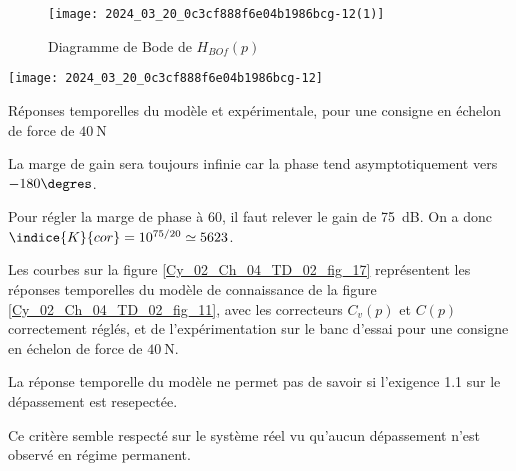 \begin{figure}[!h]
\texttt{[image: 2024\_03\_20\_0c3cf888f6e04b1986bcg-12(1)]}
\caption{Diagramme de Bode de $H_{B O f}(p)$  \label{Cy_02_Ch_04_TD_02_fig_16}}
\end{figure}

\begin{marginfigure}%
\texttt{[image: 2024\_03\_20\_0c3cf888f6e04b1986bcg-12]}
\caption{Réponses temporelles du modèle et expérimentale, pour une consigne en échelon de force de $40 \mathrm{~N}$ \label{Cy_02_Ch_04_TD_02_fig_17}}
\end{marginfigure}
\fi

\ifprof
\begin{corrige}
La marge de gain sera toujours infinie car la phase tend asymptotiquement vers $-180\degres$.

Pour régler la marge de phase à 60\degres, il faut relever le gain de \SI{75}{dB}. On a donc $\indice{K}{cor}  =10^{75/20} \simeq  5623$.
\end{corrige}
\else
\fi



\ifprof
\else
Les courbes sur la figure \ref{Cy_02_Ch_04_TD_02_fig_17} représentent les réponses temporelles du modèle de connaissance de la figure \ref{Cy_02_Ch_04_TD_02_fig_11}, avec les correcteurs $C_{v}(p)$ et $C(p)$ correctement réglés, et de l'expérimentation sur le banc d'essai pour une consigne en échelon de force de $40 \mathrm{~N}$.
\fi


\ifprof
\begin{corrige}
La réponse temporelle du modèle ne permet pas de savoir si l'exigence 1.1 sur le dépassement est resepectée. 

Ce critère semble respecté sur le système réel vu qu'aucun dépassement n'est observé en régime permanent. 
\end{corrige}
\else
\fi

